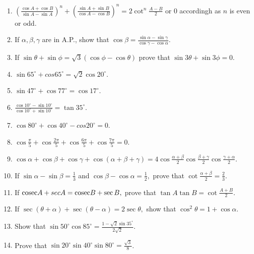 \begin{enumerate}[resume]
\item $\left(\frac{\cos A + \cos B}{\sin A - \sin A}\right)^n + \left(\frac{\sin A + \sin B}{\cos A - \cos B}\right)^n =
    2\cot^n \frac{A - B}{2}$ or $0$ accordingh as $n$ is even or odd.

\item If $\alpha, \beta, \gamma$ are in A.P., show that $\cos\beta = \frac{\sin\alpha - \sin\gamma}{\cos\gamma - \cos\alpha}$.

\item If $\sin\theta + \sin\phi = \sqrt{3}(\cos\phi - \cos\theta)$ prove that $\sin3\theta + \sin3\phi = 0$.

\item $\sin 65^\circ + cos 65^\circ = \sqrt{2}\cos 20^\circ$.

\item $\sin 47^\circ + \cos 77^\circ = \cos 17^\circ$.

\item $\frac{\cos 10^\circ - \sin 10^\circ}{\cos 10^\circ + \sin 10^\circ} = \tan 35^\circ$.

\item $\cos 80^\circ + \cos 40^\circ - cos 20^\circ = 0$.

\item $\cos\frac{\pi}{5} + \cos \frac{2\pi}{5} + \cos\frac{6\pi}{5} + \cos \frac{7\pi}{5} = 0$.

\item $\cos\alpha + \cos\beta + \cos\gamma + \cos(\alpha + \beta + \gamma) = 4\cos\frac{\alpha + \beta}{2}\cos\frac{\beta +
    \gamma}{2}\cos \frac{\gamma + \alpha}{2}$.

\item If $\sin\alpha - \sin\beta = \frac{1}{3}$ and $\cos\beta - \cos\alpha = \frac{1}{2},$ prove that
    $\cot\frac{\alpha + \beta}{2} = \frac{2}{3}$.

\item If ${\rm cosec} A + sec A = {\rm cosec} B + \sec B,$ prove that $\tan A\tan B = \cot \frac{A + B}{2}$.

\item If $\sec(\theta + \alpha) + \sec(\theta - \alpha) = 2\sec\theta,$ show that $\cos^2\theta = 1 + \cos\alpha$.

\item Show that $\sin50^\circ\cos85^\circ = \frac{1 - \sqrt{2}\sin 35^\circ}{2\sqrt{2}}$.

\item Prove that $\sin 20^\circ \sin 40^\circ\sin 80^\circ = \frac{\sqrt{3}}{8}$.


\end{enumerate}
